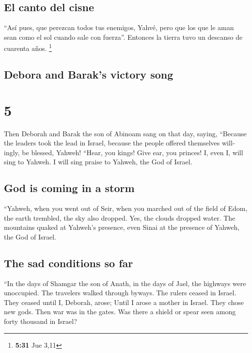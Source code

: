 \begin{paracol}{2}
{\subsection{El canto del cisne}\label{el-canto-del-cisne}}

 ``Así pues, que perezcan todos tus enemigos, Yahvé, pero
que los que le aman sean como el sol cuando sale con fuerza''. Entonces
la tierra tuvo un descanso de cuarenta años. \footnote{\textbf{5:31} Jue
  3,11}

\switchcolumn
\begin{otherlanguage}{english}

\hypertarget{debora-and-baraks-victory-song}{%
\subsection{Debora and Barak's victory
song}\label{debora-and-baraks-victory-song}}

\hypertarget{section-9}{%
\section{5}\label{section-9}}

 Then Deborah and Barak the son of Abinoam sang on that
day, saying,  ``Because the leaders took the lead in
Israel, because the people offered themselves willingly, be blessed,
Yahweh!  ``Hear, you kings! Give ear, you princes! I, even
I, will sing to Yahweh. I will sing praise to Yahweh, the God of Israel.

\hypertarget{god-is-coming-in-a-storm}{%
\subsection{God is coming in a storm}\label{god-is-coming-in-a-storm}}

 ``Yahweh, when you went out of Seir, when you marched out
of the field of Edom, the earth trembled, the sky also dropped. Yes, the
clouds dropped water.  The mountains quaked at Yahweh's
presence, even Sinai at the presence of Yahweh, the God of Israel.

\hypertarget{the-sad-conditions-so-far}{%
\subsection{The sad conditions so far}\label{the-sad-conditions-so-far}}

 ``In the days of Shamgar the son of Anath, in the days of
Jael, the highways were unoccupied. The travelers walked through byways.
 The rulers ceased in Israel. They ceased until I,
Deborah, arose; Until I arose a mother in Israel.  They
chose new gods. Then war was in the gates. Was there a shield or spear
seen among forty thousand in Israel?


\end{otherlanguage}
\end{paracol}
